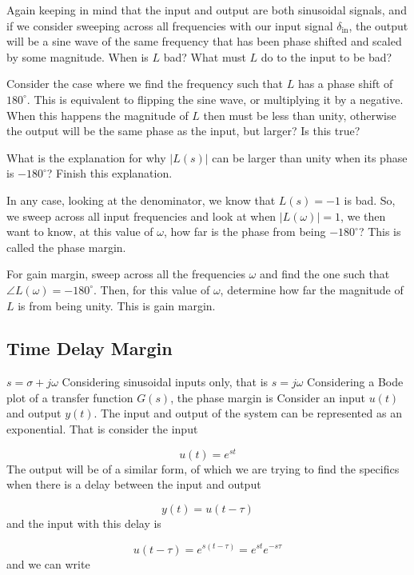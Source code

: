 Again keeping in mind that the input and output are both sinusoidal signals, and if we consider sweeping across all frequencies with our input signal $\delta_{\text{in}}$, the output will be a sine wave of the same frequency that has been phase shifted and scaled by some magnitude.
When is $L$ bad? What must $L$ do to the input to be bad?

Consider the case where we find the frequency such that $L$ has a phase shift of $180^{\circ}$.
This is equivalent to flipping the sine wave, or multiplying it by a negative.
When this happens the magnitude of $L$ then must be less than unity, otherwise the output will be the same phase as the input, but larger? Is this true?

What is the explanation for why $|L(s)|$ can be larger than unity when its phase is $-180^{\circ}$? Finish this explanation.

In any case, looking at the denominator, we know that $L(s)=-1$ is bad.
So, we sweep across all input frequencies and look at when $|L(\omega)|=1$, we then want to know, at this value of $\omega$, how far is the phase from being $-180^{\circ}$? This is called the phase margin.

For gain margin, sweep across all the frequencies $\omega$ and find the one such that $\angle L(\omega)=-180^{\circ}$.
Then, for this value of $\omega$, determine how far the magnitude of $L$ is from being unity.
This is gain margin.

\subsection{Time Delay Margin}

$s=\sigma+j\omega$
Considering sinusoidal inputs only, that is $s=j\omega$
Considering a Bode plot of a transfer function $G(s)$, the phase margin is
Consider an input $u(t)$ and output $y(t)$.
The input and output of the system can be represented as an exponential.
That is consider the input

\begin{equation*}
  u(t)=e^{st}
\end{equation*}
The output will be of a similar form, of which we are trying to find the specifics when there is a delay between the input and output

\begin{equation*}
  y(t)=u(t-\tau)
\end{equation*}
and the input with this delay is

\begin{equation*}
  u(t-\tau)=e^{s(t-\tau)}=e^{st}e^{-s\tau}
\end{equation*}
and we can write


